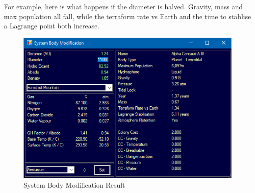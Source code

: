 \documentclass[../../Aurora C# unofficial manual.tex]{subfiles}
\begin{document}
	For example, here is what happens if the diameter is halved. Gravity, mass and max population all fall, while the terraform rate vs Earth and the time to stablise a Lagrange point both increase.
	\begin{figure}[H]
		\centering
		\includegraphics[width=0.5\linewidth]{images/SystemBodyModification2}
		\caption[System Body Modification 2]{System Body Modification Result}
		\label{fig:systembodymodification2}
	\end{figure}
\end{document}

